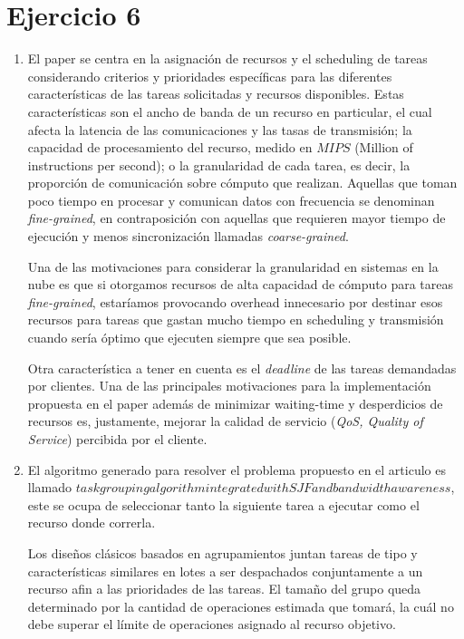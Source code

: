 \section{Ejercicio 6}

\begin{enumerate}[label=\alph*)]

    \item

	El paper se centra en la asignación de recursos y el scheduling de tareas considerando criterios y prioridades específicas para las diferentes características de las tareas solicitadas y recursos disponibles. Estas características son el ancho de banda de un recurso en particular, el cual afecta la latencia de las comunicaciones y las tasas de transmisión;
la capacidad de procesamiento del recurso, medido en $MIPS$ (Million of instructions per second); o la granularidad de cada tarea, es decir, la proporción de comunicación sobre cómputo que realizan. Aquellas que toman poco tiempo en procesar y comunican datos con frecuencia se denominan \emph{fine-grained}, en contraposición con aquellas que requieren mayor tiempo de ejecución y menos sincronización llamadas \emph{coarse-grained}. 

	Una de las motivaciones para considerar la granularidad en sistemas en la nube es que si otorgamos recursos de alta capacidad de cómputo para tareas \emph{fine-grained}, estaríamos provocando overhead innecesario por destinar esos recursos para tareas que gastan mucho tiempo en scheduling y transmisión cuando sería óptimo que ejecuten siempre que sea posible.
	
	Otra característica a tener en cuenta es el \emph{deadline} de las tareas demandadas por clientes. Una de las principales motivaciones para la implementación propuesta en el paper además de minimizar waiting-time y desperdicios de recursos es, justamente, mejorar la calidad de servicio (\emph{QoS, Quality of Service}) percibida por el cliente.

    \item El algoritmo generado para resolver el problema propuesto en el articulo es llamado $task grouping
algorithm integrated with SJF and bandwidth awareness$, este se ocupa de seleccionar tanto
        la siguiente tarea a ejecutar como el recurso donde correrla.

        Los diseños clásicos basados en agrupamientos juntan tareas de tipo
        y características similares en lotes a ser despachados conjuntamente
        a un recurso afin a las prioridades de las tareas.
        El tamaño del grupo queda determinado por la cantidad de operaciones
        estimada que tomará, la cuál no debe superar el límite de operaciones
        asignado al recurso objetivo.


\end{enumerate}
